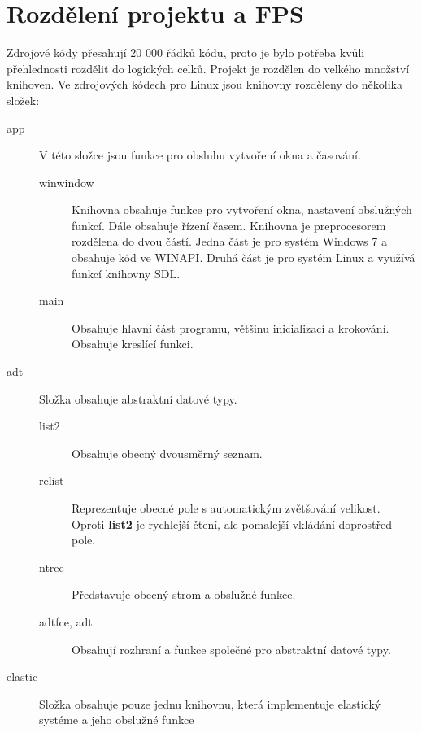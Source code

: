 
\section{Rozdělení projektu a FPS}
Zdrojové kódy přesahují 20 000 řádků kódu, proto je bylo potřeba kvůli přehlednosti rozdělit do logických celků.
Projekt je rozdělen do velkého množství knihoven.
Ve zdrojových kódech pro Linux jsou knihovny rozděleny do několika složek:
\begin{description}

\item[app] V této složce jsou funkce pro obsluhu vytvoření okna a časování.
\begin{description}
\item[winwindow] Knihovna obsahuje funkce pro vytvoření okna, nastavení obslužných funkcí.
Dále obsahuje řízení časem.
Knihovna je preprocesorem rozdělena do dvou částí.
Jedna část je pro systém Windows 7 a obsahuje kód ve WINAPI.
Druhá část je pro systém Linux a využívá funkcí knihovny SDL.
\item[main] Obsahuje hlavní část programu, většinu inicializací a krokování.
Obsahuje kreslící funkci.
\end{description}

\item[adt] Složka obsahuje abstraktní datové typy.
\begin{description}
\item[list2] Obsahuje obecný dvousměrný seznam.
\item[relist] Reprezentuje obecné pole s automatickým zvětšování velikost.
Oproti {\bf list2} je rychlejší čtení, ale pomalejší vkládání doprostřed pole.
\item[ntree] Představuje obecný strom a obslužné funkce.
\item[adtfce, adt] Obsahují rozhraní a funkce společné pro abstraktní datové typy.
\end{description}

\item[elastic] Složka obsahuje pouze jednu knihovnu, která implementuje elastický systéme a jeho obslužné funkce


\end{description}
